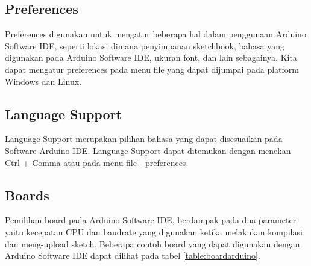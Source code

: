 \subsection{Preferences}
Preferences digunakan untuk mengatur beberapa hal dalam penggunaan Arduino Software IDE, seperti lokasi dimana penyimpanan sketchbook, bahasa yang digunakan pada Arduino Software IDE, ukuran font, dan lain sebagainya. Kita dapat mengatur preferences pada menu file yang dapat dijumpai pada platform Windows dan Linux.

\subsection{Language Support}
Language Support merupakan pilihan bahasa yang dapat disesuaikan pada Software Arduino IDE. Language Support dapat ditemukan dengan menekan Ctrl + Comma atau pada menu file - preferences.

\subsection{Boards}
Pemilihan board pada Arduino Software IDE, berdampak pada dua parameter yaitu kecepatan CPU dan baudrate yang digunakan ketika melakukan kompilasi dan meng-upload sketch. Beberapa contoh board yang dapat digunakan dengan Arduino Software IDE dapat dilihat pada tabel \ref{table:boardarduino}.


